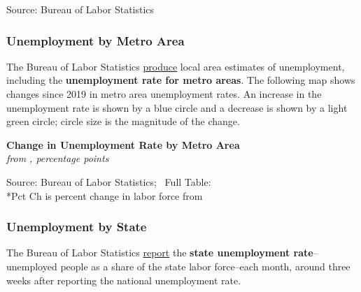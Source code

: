 \documentclass{report}
\newcommand{\tbllink}[1]{\href{https://raw.githubusercontent.com/bdecon/US-chartbook/master/chartbook/data/#1}{\faTable}}
\begin{document}
{\begin{minipage}{1.0\textwidth}
\footnotesize{Source: Bureau of Labor Statistics} \hfill \tbllink{unempdur.csv}
\end{minipage}
\newpage
\begin{minipage}{1.0\textwidth} 
\subsubsection*{Unemployment by Metro Area}
\vspace{-1mm}

\small The Bureau of Labor Statistics \href{https://www.bls.gov/lau/}{produce} local area estimates of unemployment, including the \textbf{unemployment rate for metro areas}. The following map shows changes since 2019 in metro area unemployment rates. An increase in the unemployment rate is shown by a blue circle and a decrease is shown by a light green circle; circle size is the magnitude of the change. 


\end{minipage}
\vspace{1mm}

\begin{minipage}{0.82\textwidth}
\normalsize \textbf{Change in Unemployment Rate by Metro Area}\\
\footnotesize{\textit{from \unskip, percentage points}}
\vspace{-3mm}

\hspace*{-8mm} 
\vspace{-3mm}

\footnotesize{Source: Bureau of Labor Statistics; \ Full Table: \tbllink{msa_unemp_rate.csv} \\ \**Pct Ch is percent change in labor force from }
\end{minipage}
\newpage
\begin{minipage}{1.0\textwidth} 
\subsubsection*{Unemployment by State}
\small The Bureau of Labor Statistics \href{https://www.bls.gov/lau/}{report} the \textbf{state unemployment rate}--unemployed people as a share of the state labor force--each month, around three weeks after reporting the national unemployment rate. 


\end{minipage}}
\end{document}
